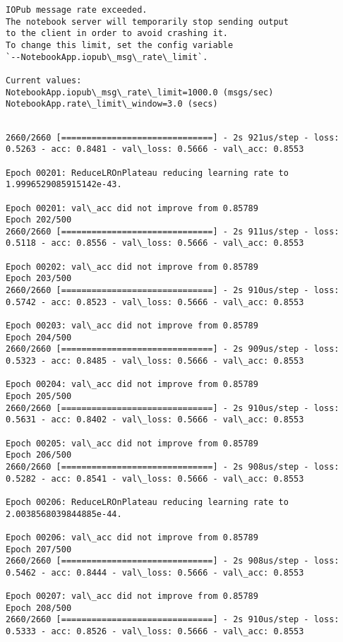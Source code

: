 \documentclass[11pt]{article}
\begin{document}
    \begin{Verbatim}[commandchars=\\\{\}]
IOPub message rate exceeded.
The notebook server will temporarily stop sending output
to the client in order to avoid crashing it.
To change this limit, set the config variable
`--NotebookApp.iopub\_msg\_rate\_limit`.

Current values:
NotebookApp.iopub\_msg\_rate\_limit=1000.0 (msgs/sec)
NotebookApp.rate\_limit\_window=3.0 (secs)


    \end{Verbatim}

    \begin{Verbatim}[commandchars=\\\{\}]
2660/2660 [==============================] - 2s 921us/step - loss: 0.5263 - acc: 0.8481 - val\_loss: 0.5666 - val\_acc: 0.8553

Epoch 00201: ReduceLROnPlateau reducing learning rate to 1.9996529085915142e-43.

Epoch 00201: val\_acc did not improve from 0.85789
Epoch 202/500
2660/2660 [==============================] - 2s 911us/step - loss: 0.5118 - acc: 0.8556 - val\_loss: 0.5666 - val\_acc: 0.8553

Epoch 00202: val\_acc did not improve from 0.85789
Epoch 203/500
2660/2660 [==============================] - 2s 910us/step - loss: 0.5742 - acc: 0.8523 - val\_loss: 0.5666 - val\_acc: 0.8553

Epoch 00203: val\_acc did not improve from 0.85789
Epoch 204/500
2660/2660 [==============================] - 2s 909us/step - loss: 0.5323 - acc: 0.8485 - val\_loss: 0.5666 - val\_acc: 0.8553

Epoch 00204: val\_acc did not improve from 0.85789
Epoch 205/500
2660/2660 [==============================] - 2s 910us/step - loss: 0.5631 - acc: 0.8402 - val\_loss: 0.5666 - val\_acc: 0.8553

Epoch 00205: val\_acc did not improve from 0.85789
Epoch 206/500
2660/2660 [==============================] - 2s 908us/step - loss: 0.5282 - acc: 0.8541 - val\_loss: 0.5666 - val\_acc: 0.8553

Epoch 00206: ReduceLROnPlateau reducing learning rate to 2.0038568039844885e-44.

Epoch 00206: val\_acc did not improve from 0.85789
Epoch 207/500
2660/2660 [==============================] - 2s 908us/step - loss: 0.5462 - acc: 0.8444 - val\_loss: 0.5666 - val\_acc: 0.8553

Epoch 00207: val\_acc did not improve from 0.85789
Epoch 208/500
2660/2660 [==============================] - 2s 910us/step - loss: 0.5333 - acc: 0.8526 - val\_loss: 0.5666 - val\_acc: 0.8553


\end{Verbatim}
\end{document}
